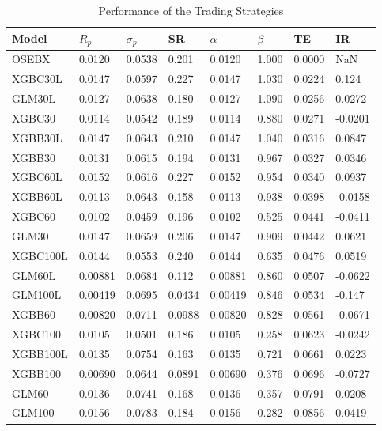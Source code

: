 \begin{table}[H]
\centering
\begin{tabularx}{\textwidth}{Xlllllll}
\hline
Model          & $R_p$  & $\sigma_p$ & SR & $\alpha$  & $\beta$  & TE & IR \\
\hline
OSEBX    & 0.0120  & 0.0538 & 0.201  & 0.0120 & 1.000 & 0.0000         & NaN               \\
\hline
XGBC30L  & 0.0147  & 0.0597 & 0.227  & 0.0147 & 1.030 & 0.0224         & 0.124             \\
GLM30L   & 0.0127  & 0.0638 & 0.180  & 0.0127 & 1.090 & 0.0256         & 0.0272            \\
XGBC30   & 0.0114  & 0.0542 & 0.189  & 0.0114 & 0.880 & 0.0271         & -0.0201           \\
XGBB30L  & 0.0147  & 0.0643 & 0.210  & 0.0147 & 1.040 & 0.0316         & 0.0847            \\
XGBB30   & 0.0131  & 0.0615 & 0.194  & 0.0131 & 0.967 & 0.0327         & 0.0346            \\
XGBC60L  & 0.0152  & 0.0616 & 0.227  & 0.0152 & 0.954 & 0.0340         & 0.0937            \\
XGBB60L  & 0.0113  & 0.0643 & 0.158  & 0.0113 & 0.938 & 0.0398         & -0.0158           \\
XGBC60   & 0.0102  & 0.0459 & 0.196  & 0.0102 & 0.525 & 0.0441         & -0.0411           \\
GLM30    & 0.0147  & 0.0659 & 0.206  & 0.0147 & 0.909 & 0.0442         & 0.0621            \\
XGBC100L & 0.0144  & 0.0553 & 0.240  & 0.0144 & 0.635 & 0.0476         & 0.0519            \\
GLM60L   & 0.00881 & 0.0684 & 0.112  & 0.00881 & 0.860 & 0.0507        & -0.0622           \\
GLM100L  & 0.00419 & 0.0695 & 0.0434 & 0.00419 & 0.846 & 0.0534        & -0.147            \\
XGBB60   & 0.00820 & 0.0711 & 0.0988 & 0.00820 & 0.828 & 0.0561        & -0.0671           \\
XGBC100  & 0.0105  & 0.0501 & 0.186  & 0.0105 & 0.258 & 0.0623         & -0.0242           \\
XGBB100L & 0.0135  & 0.0754 & 0.163  & 0.0135 & 0.721 & 0.0661         & 0.0223            \\
XGBB100  & 0.00690 & 0.0644 & 0.0891 & 0.00690 & 0.376 & 0.0696       & -0.0727           \\
GLM60    & 0.0136  & 0.0741 & 0.168  & 0.0136 & 0.357 & 0.0791         & 0.0208            \\
GLM100   & 0.0156  & 0.0783 & 0.184  & 0.0156 & 0.282 & 0.0856         & 0.0419            \\
\hline
\end{tabularx}
\caption{Performance of the Trading Strategies}
\label{tab:performance-trading-return-sigma-sharpe-alpha-beta-te-ir}
\end{table}



